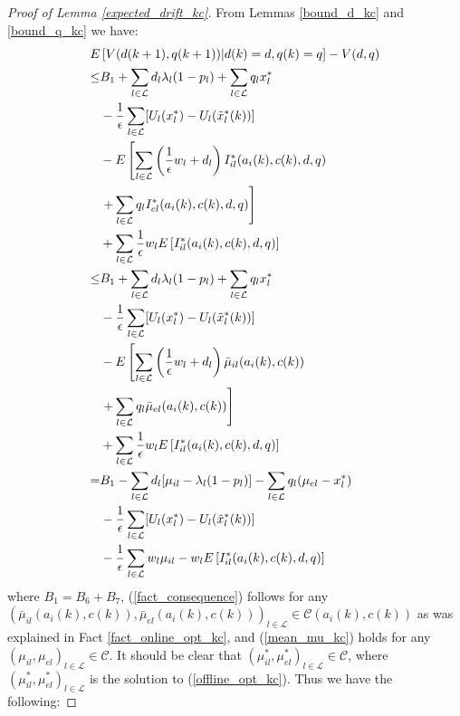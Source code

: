 \documentclass[conference]{IEEEtran}
\begin{document}
\begin{proof}[Proof of Lemma \ref{expected_drift_kc}]
From Lemmas \ref{bound_d_kc} and \ref{bound_q_kc} we have:
\begin{align}
	E & \left[ V(d(k+1),q(k+1)) | d(k)=d, q(k)=q \right] - V(d,q) \notag \\
 	\leq & B_1 + \sum_{l \in \mathcal{L}} d_l \lambda_l (1-p_l) + \sum_{l \in \mathcal{L}} q_l x_l^* \notag \\
 	& - \frac{1}{\epsilon} \sum_{l \in \mathcal{L}} [ U_l(x_l^*) - U_l(\tilde{x}_l^*(k)) ] \notag \\
 	& - E \left[ \sum_{l \in \mathcal{L}} \left( \frac{1}{\epsilon}w_l + d_l \right) I_{il}^*(a_i(k),c(k),d,q) \right. \notag \\
 	& \left. + \sum_{l \in \mathcal{L}} q_l I_{el}^*(a_i(k),c(k),d,q) \right] \notag \\
 	& + \sum_{l \in \mathcal{L}} \frac{1}{\epsilon}w_l E \left[ I_{il}^*(a_i(k),c(k),d,q) \right] \notag \\
 	\leq & B_1 + \sum_{l \in \mathcal{L}} d_l \lambda_l (1-p_l) + \sum_{l \in \mathcal{L}} q_l x_l^* \label{fact_consequence} \\
 	& - \frac{1}{\epsilon} \sum_{l \in \mathcal{L}} [ U_l(x_l^*) - U_l(\tilde{x}_l^*(k)) ] \notag \\
 	& - E \left[ \sum_{l \in \mathcal{L}} \left( \frac{1}{\epsilon}w_l + d_l \right) \bar{\mu}_{il}(a_i(k),c(k)) \right. \notag \\
 	& \left. + \sum_{l \in \mathcal{L}} q_l \bar{\mu}_{el}(a_i(k),c(k)) \right] \notag \\
 	& + \sum_{l \in \mathcal{L}} \frac{1}{\epsilon}w_l E \left[ I_{il}^*(a_i(k),c(k),d,q) \right] \notag \\
 	= & B_1 - \sum_{l \in \mathcal{L}} d_l [ \mu_{il} - \lambda_l (1-p_l) ] - \sum_{l \in \mathcal{L}} q_l (\mu_{el} - x_l^*) \label{mean_mu_kc} \\
 	& - \frac{1}{\epsilon} \sum_{l \in \mathcal{L}} [ U_l(x_l^*) - U_l(\tilde{x}_l^*(k)) ] \notag \\
 	& - \frac{1}{\epsilon} \sum_{l \in \mathcal{L}} w_l \mu_{il} - w_l E \left[ I_{il}^*(a_i(k),c(k),d,q) \right] \notag
\end{align}
where $B_1=B_6+B_7$, (\ref{fact_consequence}) follows for any $( \bar{\mu}_{il}(a_i(k),c(k)), \bar{\mu}_{el}(a_i(k),c(k)) )_{l \in \mathcal{L}} \in \mathcal{C}(a_i(k),c(k))$ as was explained in Fact \ref{fact_online_opt_kc}, and (\ref{mean_mu_kc}) holds for any $( \mu_{il}, \mu_{el} )_{l \in \mathcal{L}} \in \mathcal{C}$. It should be clear that $( \mu^*_{il}, \mu^*_{el} )_{l \in \mathcal{L}} \in \mathcal{C}$, where $( \mu^*_{il}, \mu^*_{el} )_{l \in \mathcal{L}}$ is the solution to (\ref{offline_opt_kc}). Thus we have the following:

\end{proof}
\end{document}
